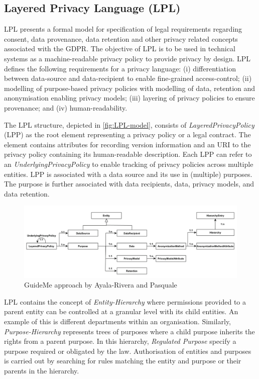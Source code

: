 \subsection*{Layered Privacy Language (LPL)}
LPL \cite{gerl_lpl_2018} presents a formal model for specification of legal requirements regarding consent, data provenance, data retention and other privacy related concepts associated with the GDPR.
The objective of LPL is to be used in technical systems as a machine-readable privacy policy to provide privacy by design. 
LPL defines the following requirements for a privacy language: (i) differentiation between data-source and data-recipient to enable fine-grained access-control; (ii) modelling of purpose-based privacy policies with modelling of data, retention and anonymisation enabling privacy models; (iii) layering of privacy policies to ensure provenance; and (iv) human-readability.

The LPL structure, depicted in \autoref{fig:LPL-model}, consists of \textit{LayeredPrivacyPolicy} (LPP) as the root element representing a privacy policy or a legal contract. The element contains attributes for recording version information and an URI to the privacy policy containing its human-readable description. Each LPP can refer to an \textit{UnderlyingPrivacyPolicy} to enable tracking of privacy policies across multiple entities.
LPP is associated with a data source and its use in (multiple) purposes. The purpose is further associated with data recipients, data, privacy models, and data retention.
\begin{figure}[htbp]
    \centering
    \includegraphics[width=\linewidth]{img/LPL_model.png}
    \caption{GuideMe approach by Ayala-Rivera and Pasquale \cite{gerl_lpl_2018}}
    \label{fig:LPL-model}
\end{figure}

LPL contains the concept of \textit{Entity-Hierarchy} where permissions provided to a parent entity can be controlled at a granular level with its child entities. An example of this is different departments within an organisation. Similarly, \textit{Purpose-Hierarchy} represents trees of purposes where a child purpose inherits the rights from a parent purpose. In this hierarchy, \textit{Regulated Purpose} specify a purpose required or obligated by the law.
Authorisation of entities and purposes is carried out by searching for rules matching the entity and purpose or their parents in the hierarchy. 

